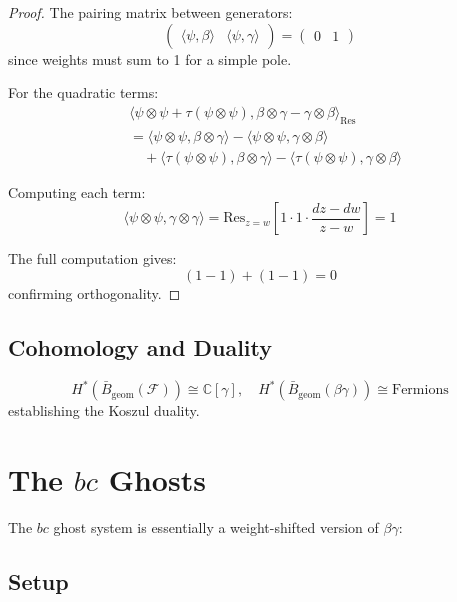 \begin{proof}
The pairing matrix between generators:
\[
\begin{pmatrix}
\langle \psi, \beta \rangle & \langle \psi, \gamma \rangle
\end{pmatrix} = 
\begin{pmatrix}
0 & 1
\end{pmatrix}
\]
since weights must sum to 1 for a simple pole.
 
For the quadratic terms:
\begin{align}
&\langle \psi \otimes \psi + \tau(\psi \otimes \psi), \beta \otimes \gamma - \gamma \otimes \beta \rangle_{\text{Res}} \\
&= \langle \psi \otimes \psi, \beta \otimes \gamma \rangle - \langle \psi \otimes \psi, \gamma \otimes \beta \rangle \\
&\quad + \langle \tau(\psi \otimes \psi), \beta \otimes \gamma \rangle - \langle \tau(\psi \otimes \psi), \gamma \otimes \beta \rangle
\end{align}
 
Computing each term:
\[
\langle \psi \otimes \psi, \gamma \otimes \gamma \rangle = \text{Res}_{z=w}\left[1 \cdot 1 \cdot \frac{dz-dw}{z-w}\right] = 1
\]
 
The full computation gives:
\[
(1 - 1) + (1 - 1) = 0
\]
confirming orthogonality.
\end{proof}
 
\subsection{Cohomology and Duality}
 
\begin{theorem}
\[
H^*(\bar{B}_{\text{geom}}(\mathcal{F})) \cong \mathbb{C}[\gamma], \quad 
H^*(\bar{B}_{\text{geom}}(\beta\gamma)) \cong \text{Fermions}
\]
establishing the Koszul duality.
\end{theorem}
 
\section{The $bc$ Ghosts}
 
The $bc$ ghost system is essentially a weight-shifted version of $\beta\gamma$:
 
\subsection{Setup}
 
